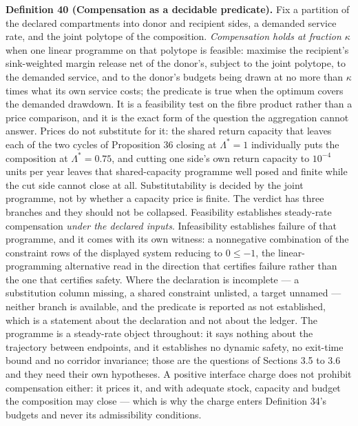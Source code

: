 \documentclass[11pt]{article}
\begin{document}
\textbf{Definition 40 (Compensation as a decidable predicate).} Fix a partition of the declared compartments into donor and recipient sides, a demanded service rate, and the joint polytope of the composition. \emph{Compensation holds at fraction \(\kappa\)} when one linear programme on that polytope is feasible: maximise the recipient's sink-weighted margin release net of the donor's, subject to the joint polytope, to the demanded service, and to the donor's budgets being drawn at no more than \(\kappa\) times what its own service costs; the predicate is true when the optimum covers the demanded drawdown. It is a feasibility test on the fibre product rather than a price comparison, and it is the exact form of the question the aggregation cannot answer. Prices do not substitute for it: the shared return capacity that leaves each of the two cycles of Proposition 36 closing at \(\Lambda^{*} = 1\) individually puts the composition at \(\Lambda^{*} = 0.75\), and cutting one side's own return capacity to \(10^{-4}\) units per year leaves that shared-capacity programme well posed and finite while the cut side cannot close at all. Substitutability is decided by the joint programme, not by whether a capacity price is finite. The verdict has three branches and they should not be collapsed. Feasibility establishes steady-rate compensation \emph{under the declared inputs}. Infeasibility establishes failure of that programme, and it comes with its own witness: a nonnegative combination of the constraint rows of the displayed system reducing to \(0 \le -1\), the linear-programming alternative read in the direction that certifies failure rather than the one that certifies safety. Where the declaration is incomplete --- a substitution column missing, a shared constraint unlisted, a target unnamed --- neither branch is available, and the predicate is reported as not established, which is a statement about the declaration and not about the ledger. The programme is a steady-rate object throughout: it says nothing about the trajectory between endpoints, and it establishes no dynamic safety, no exit-time bound and no corridor invariance; those are the questions of Sections 3.5 to 3.6 and they need their own hypotheses. A positive interface charge does not prohibit compensation either: it prices it, and with adequate stock, capacity and budget the composition may close --- which is why the charge enters Definition 34's budgets and never its admissibility conditions.
\end{document}
